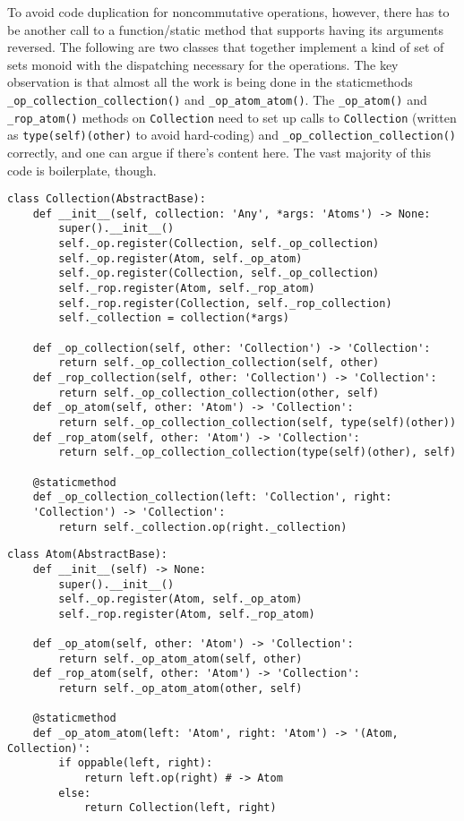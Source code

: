 \documentclass[12pt]{article}
\begin{document}
To avoid code duplication for noncommutative operations, however,
there has to be another call to a function/static method that supports
having its arguments reversed.  The following are two classes that
together implement a kind of set of sets monoid with the dispatching
necessary for the operations.  The key observation is that almost all
the work is being done in the staticmethods
\texttt{\_op\_collection\_collection()} and \texttt{\_op\_atom\_atom()}.
The \texttt{\_op\_atom()} and \texttt{\_rop\_atom()} methods on
\texttt{Collection} need to set up calls to \texttt{Collection}
(written as \texttt{type(self)(other)} to avoid hard-coding) and
\texttt{\_op\_collection\_collection()} correctly, and one can argue if
there's content here.  The vast majority of this code is boilerplate,
though.

\begin{lstlisting}
class Collection(AbstractBase):
    def __init__(self, collection: 'Any', *args: 'Atoms') -> None:
        super().__init__()
        self._op.register(Collection, self._op_collection)
        self._op.register(Atom, self._op_atom)
        self._op.register(Collection, self._op_collection)
        self._rop.register(Atom, self._rop_atom)
        self._rop.register(Collection, self._rop_collection)
        self._collection = collection(*args)

    def _op_collection(self, other: 'Collection') -> 'Collection':
        return self._op_collection_collection(self, other)
    def _rop_collection(self, other: 'Collection') -> 'Collection':
        return self._op_collection_collection(other, self)
    def _op_atom(self, other: 'Atom') -> 'Collection':
        return self._op_collection_collection(self, type(self)(other))
    def _rop_atom(self, other: 'Atom') -> 'Collection':
        return self._op_collection_collection(type(self)(other), self)

    @staticmethod
    def _op_collection_collection(left: 'Collection', right:
    'Collection') -> 'Collection':
        return self._collection.op(right._collection)
\end{lstlisting}

\begin{lstlisting}
class Atom(AbstractBase):
    def __init__(self) -> None:
        super().__init__()
        self._op.register(Atom, self._op_atom)
        self._rop.register(Atom, self._rop_atom)

    def _op_atom(self, other: 'Atom') -> 'Collection':
        return self._op_atom_atom(self, other)
    def _rop_atom(self, other: 'Atom') -> 'Collection':
        return self._op_atom_atom(other, self)

    @staticmethod
    def _op_atom_atom(left: 'Atom', right: 'Atom') -> '(Atom, Collection)':
        if oppable(left, right):
            return left.op(right) # -> Atom
        else:
            return Collection(left, right)
\end{lstlisting}
\end{document}

